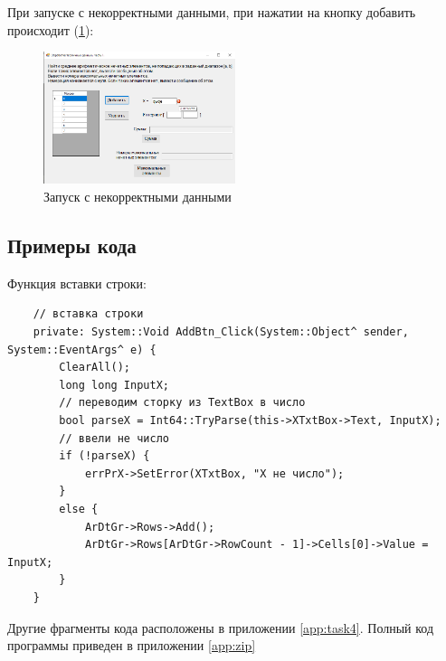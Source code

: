 При запуске с некорректными данными, при нажатии на кнопку добавить происходит  (\ref{fig:BadInputNotIntForm4}):

\begin{figure}[!h]
    \centering
    \includegraphics[width = 0.5\textwidth]{images/Task4/BadInputNotIntX.png}
    \caption{Запуск с некорректными данными}
    \label{fig:BadInputNotIntForm4}
\end{figure}

\subsection{Примеры кода}

Функция вставки строки: 

\begin{verbatim}
	// вставка строки
	private: System::Void AddBtn_Click(System::Object^ sender, System::EventArgs^ e) {
		ClearAll();
		long long InputX;
		// переводим сторку из TextBox в число
		bool parseX = Int64::TryParse(this->XTxtBox->Text, InputX);
		// ввели не число
		if (!parseX) {
			errPrX->SetError(XTxtBox, "X не число");
		}
		else {
			ArDtGr->Rows->Add();
			ArDtGr->Rows[ArDtGr->RowCount - 1]->Cells[0]->Value = InputX;
		}
	}
\end{verbatim}

Другие фрагменты кода расположены в приложении \ref{app:task4}. Полный код программы приведен в приложении \ref{app:zip}
